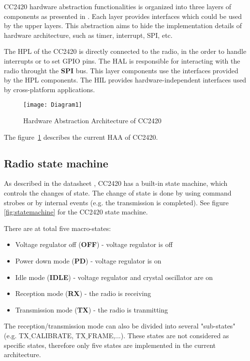 \documentclass[a4paper,11pt]{article}
\begin{document}
CC2420 hardware abstraction functionalities is organized into three layers of components as presented in \cite{tep2}. Each layer provides interfaces which could be used by the upper layers. This abstraction aims to hide the implementation details of hardware architecture, such as timer, interrupt, SPI, etc.

The HPL of the CC2420 is directly connected to the radio, in the order to handle interrupts or to set GPIO pins.
The HAL is responsible for interacting with the radio throught the \textbf{SPI} bus. This layer components use the interfaces provided by the HPL components.
The HIL provides hardware-independent interfaces used by cross-platform applications.

	\begin{figure}[t]
    \centering
		\texttt{[image: Diagram1]}
		\caption{Hardware Abstraction Architecture of CC2420}
    \label{fig:haa}
	\end{figure}

The figure~\ref{fig:haa} describes the current HAA of CC2420.

  \subsection{Radio state machine}

As described in the datasheet \cite{cc2420}, CC2420 has a built-in state machine, which controls the changes of state. The change of state is done by using command strobes or by internal events (e.g. the transmission is completed). See figure \ref{fig:statemachine} for the CC2420 state machine.


There are at total five macro-states:
  \begin{itemize}
    \item Voltage regulator off (\textbf{OFF}) - voltage regulator is off
    \item Power down mode (\textbf{PD}) - voltage regulator is on
    \item Idle mode (\textbf{IDLE}) - voltage regulator and crystal oscillator are on
    \item Reception mode (\textbf{RX}) - the radio is receiving
    \item Transmission mode (\textbf{TX}) - the radio is tranmitting
  \end{itemize}

The reception/transmission mode can also be divided into several "sub-states" (e.g. TX$\_$CALIBRATE, TX$\_$FRAME,...). These states are not considered as specific states, therefore only five states are implemented in the current architecture.
\end{document}
